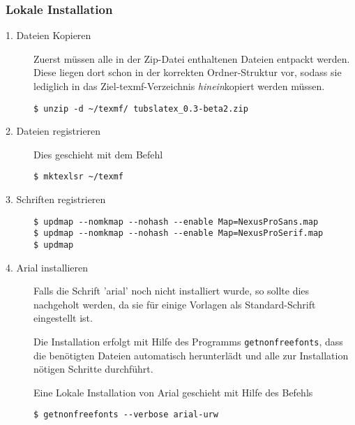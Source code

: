 \subsubsection{Lokale Installation}

\begin{description}
  \item[1. Dateien Kopieren] Zuerst müssen alle in der Zip-Datei enthaltenen
    Dateien entpackt werden.
    Diese liegen dort schon in der korrekten Ordner-Struktur vor, sodass
    sie lediglich in das Ziel-texmf-Verzeichnis \emph{hinein}kopiert werden
    müssen.
    \begin{lstlisting}[style=cmd]
$ unzip -d ~/texmf/ tubslatex_0.3-beta2.zip
    \end{lstlisting}

  \item[2. Dateien registrieren]
    Dies geschieht mit dem Befehl
    \begin{lstlisting}[style=cmd]
$ mktexlsr ~/texmf
    \end{lstlisting}

  \item[3. Schriften registrieren]\hfill

    \begin{lstlisting}[style=cmd]
$ updmap --nomkmap --nohash --enable Map=NexusProSans.map
$ updmap --nomkmap --nohash --enable Map=NexusProSerif.map
$ updmap
    \end{lstlisting}
    
  \item[4. Arial installieren]
    Falls die Schrift 'arial' noch nicht installiert wurde, so sollte dies
    nachgeholt werden, da sie für einige Vorlagen als Standard-Schrift
    eingestellt ist.
    
    Die Installation erfolgt mit Hilfe des Programms \lstinline{getnonfreefonts},
    dass die benötigten Dateien automatisch herunterlädt und alle zur Installation
    nötigen Schritte durchführt.
    
    Eine Lokale Installation von Arial geschieht mit Hilfe des Befehls
    \begin{lstlisting}[style=cmd]
$ getnonfreefonts --verbose arial-urw
    \end{lstlisting}
    
\end{description}



\newenvironment{knownissue}[1]{%
  \item {\sffamily\bfseries#1}\hfill
  \newcommand{\solution}[1]{\noindent{\itshape ##1}}
}{%
}

